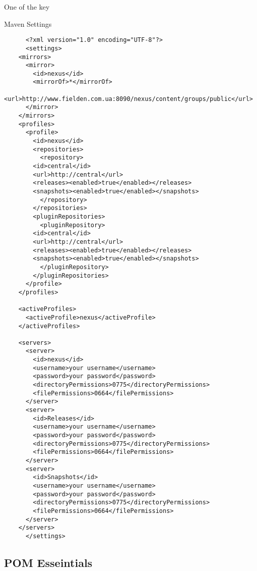   One of the key 

  \begin{code}{Maven Settings}{\label{lst:settings}}
    \begin{lstlisting}
      <?xml version="1.0" encoding="UTF-8"?>
      <settings>
	<mirrors>
	  <mirror>
	    <id>nexus</id>
	    <mirrorOf>*</mirrorOf>
	    <url>http://www.fielden.com.ua:8090/nexus/content/groups/public</url>
	  </mirror>
	</mirrors>
	<profiles>
	  <profile>
	    <id>nexus</id>
	    <repositories>
	      <repository>
		<id>central</id>
		<url>http://central</url>
		<releases><enabled>true</enabled></releases>
		<snapshots><enabled>true</enabled></snapshots>
	      </repository>
	    </repositories>
	    <pluginRepositories>
	      <pluginRepository>
		<id>central</id>
		<url>http://central</url>
		<releases><enabled>true</enabled></releases>
		<snapshots><enabled>true</enabled></snapshots>
	      </pluginRepository>
	    </pluginRepositories>
	  </profile>
	</profiles>

	<activeProfiles>
	  <activeProfile>nexus</activeProfile>
	</activeProfiles>

	<servers>
	  <server>
	    <id>nexus</id>
	    <username>your username</username>
	    <password>your password</password>
	    <directoryPermissions>0775</directoryPermissions>
	    <filePermissions>0664</filePermissions>
	  </server>
	  <server>
	    <id>Releases</id>
	    <username>your username</username>
	    <password>your password</password>
	    <directoryPermissions>0775</directoryPermissions>
	    <filePermissions>0664</filePermissions>
	  </server>
	  <server>
	    <id>Snapshots</id>
	    <username>your username</username>
	    <password>your password</password>
	    <directoryPermissions>0775</directoryPermissions>
	    <filePermissions>0664</filePermissions>
	  </server>
	</servers>
      </settings>
    \end{lstlisting}
  \end{code}


  \subsection*{POM Esseintials}  

